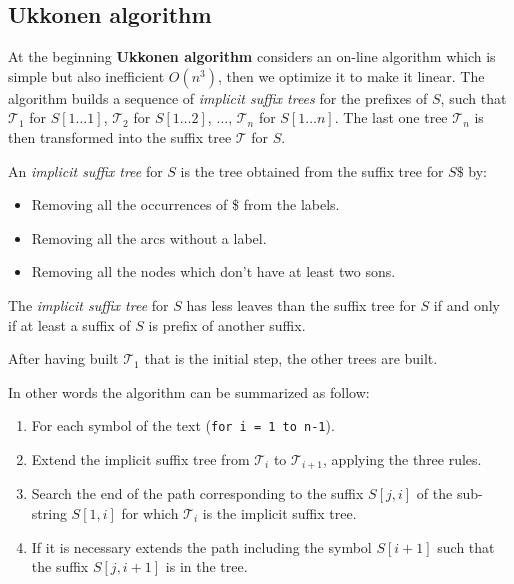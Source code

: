 \subsection{Ukkonen algorithm}
At the beginning \textbf{Ukkonen algorithm} considers an on-line algorithm which is simple but also inefficient $O(n^3)$, then we optimize it to make it linear. The algorithm builds a sequence of \textit{implicit suffix trees} for the prefixes of $S$, such that $\mathcal{T}_1$ for $S[1 \dots 1]$, $\mathcal{T}_2$ for $S[1 \dots 2]$, $\dots$, $\mathcal{T}_n$ for $S[1 \dots n]$. The last one tree $\mathcal{T}_n$ is then transformed into the suffix tree $\mathcal{T}$ for $S$.
\par \bigskip \noindent
An \textit{implicit suffix tree} for $S$ is the tree obtained from the suffix tree for $S\$$ by:
\begin{itemize}
	\item Removing all the occurrences of \$ from the labels.
	\item Removing all the arcs without a label.
	\item Removing all the nodes which don't have at least two sons.
\end{itemize} 
The \textit{implicit suffix tree} for $S$ has less leaves than the suffix tree for $S$ if and only if at least a suffix of $S$ is prefix of another suffix.
\par \bigskip \noindent
After having built $\mathcal{T}_1$ that is the initial step, the other trees are built.

In other words the algorithm can be summarized as follow:
\begin{enumerate}
	\item For each symbol of the text (\verb|for i = 1 to n-1|).
	\item Extend the implicit suffix tree from $\mathcal{T}_i$ to $\mathcal{T}_{i+1}$, applying the three rules.
	\item Search the end of the path corresponding to the suffix $S[j,i]$ of the sub-string $S[1, i]$ for which $\mathcal{T}_i$ is the implicit suffix tree.
	\item If it is necessary extends the path including the symbol $S[i+1]$ such that the suffix $S[j, i+1]$ is in the tree.
\end{enumerate}


